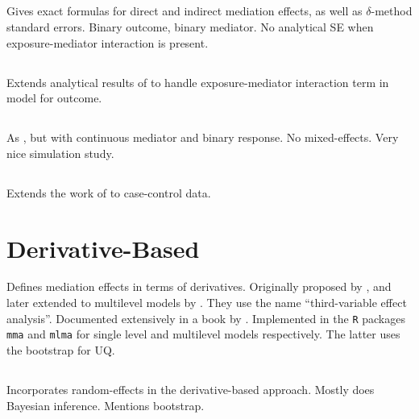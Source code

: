 \documentclass{article}
\begin{document}
\subsection{\citet{Sam18}}

Gives exact formulas for direct and indirect mediation effects, as well as $\delta$-method standard errors. Binary outcome, binary mediator. No analytical SE when exposure-mediator interaction is present.

\subsection{\citet{Sam21}}

Extends analytical results of \citet{Sam18} to handle exposure-mediator interaction term in model for outcome.

\subsection{\citet{Sam23}}

As \citet{Sam18}, but with continuous mediator and binary response. No mixed-effects. Very nice simulation study.

\subsection{\citet{Cau24}}

Extends the work of \citet{Sam23} to case-control data.


\section{Derivative-Based}

Defines mediation effects in terms of derivatives. Originally proposed by \citet{Yu14}, and later extended to multilevel models by \citet{Yu20}. They use the name ``third-variable effect analysis''. Documented extensively in a book by \citet{Yu22}. Implemented in the \texttt{R} packages \texttt{mma} and \texttt{mlma} for single level and multilevel models respectively. The latter uses the bootstrap for UQ.

\subsection{\citet{Mar24}}

Incorporates random-effects in the derivative-based approach. Mostly does Bayesian inference. Mentions bootstrap.
\end{document}
